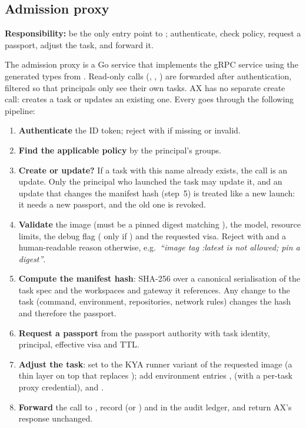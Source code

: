 \subsection{Admission proxy}\label{sec:admission}

\textbf{Responsibility:} be the only entry point to ; authenticate, check policy, request a passport, adjust the task, and forward it.

The admission proxy is a Go service that implements the  gRPC service using the generated types from . Read-only calls (, , ) are forwarded after authentication, filtered so that principals only see their own tasks. AX has no separate create call:  creates a task or updates an existing one. Every  goes through the following pipeline:

\begin{enumerate}
  \item \textbf{Authenticate} the ID token; reject with  if missing or invalid.
  \item \textbf{Find the applicable policy} by the principal's groups.
  \item \textbf{Create or update?} If a task with this name already exists, the call is an update. Only the principal who launched the task may update it, and an update that changes the manifest hash (step~5) is treated like a new launch: it needs a new passport, and the old one is revoked.
  \item \textbf{Validate} the image (must be a pinned digest matching ), the model, resource limits, the debug flag ( only if ) and the requested visa. Reject with  and a human-readable reason otherwise, e.g.\ \emph{``image tag :latest is not allowed; pin a digest''}.
  \item \textbf{Compute the manifest hash}: SHA-256 over a canonical serialisation of the task spec and the workspaces and gateway it references. Any change to the task (command, environment, repositories, network rules) changes the hash and therefore the passport.
  \item \textbf{Request a passport} from the passport authority with task identity, principal, effective visa and TTL.
  \item \textbf{Adjust the task}: set  to the KYA runner variant of the requested image (a thin layer on top that replaces ); add environment entries ,  (with a per-task proxy credential),  and .
  \item \textbf{Forward} the call to , record  (or ) and  in the audit ledger, and return AX's response unchanged.
\end{enumerate}

